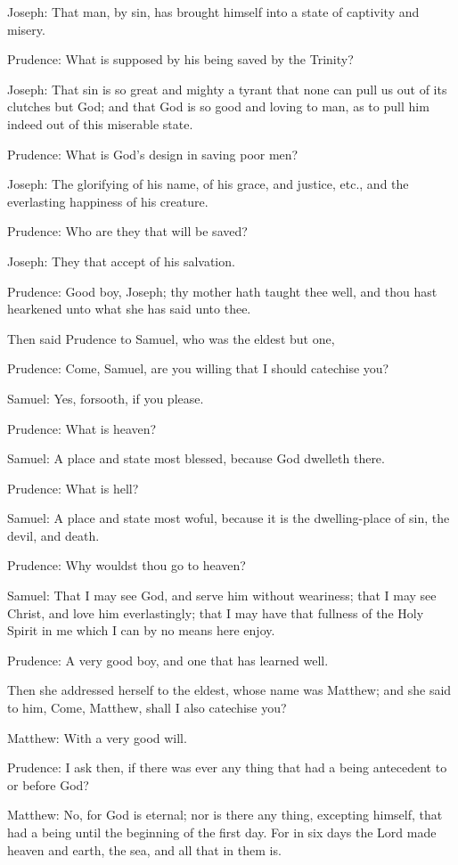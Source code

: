 Joseph: That man, by sin, has brought himself into a state of captivity and misery.

Prudence: What is supposed by his being saved by the Trinity?

Joseph: That sin is so great and mighty a tyrant that none can pull us out of its clutches but God; and that God is so good and loving to man, as to pull him indeed out of this miserable state.

Prudence: What is God's design in saving poor men?

Joseph: The glorifying of his name, of his grace, and justice, etc., and the everlasting happiness of his creature.

Prudence: Who are they that will be saved?

Joseph: They that accept of his salvation.

Prudence: Good boy, Joseph; thy mother hath taught thee well, and thou hast hearkened unto what she has said unto thee.

Then said Prudence to Samuel, who was the eldest but one,

Prudence: Come, Samuel, are you willing that I should catechise you?

Samuel: Yes, forsooth, if you please.

Prudence: What is heaven?

Samuel: A place and state most blessed, because God dwelleth there.

Prudence: What is hell?

Samuel: A place and state most woful, because it is the dwelling-place of sin, the devil, and death.

Prudence: Why wouldst thou go to heaven?

Samuel: That I may see God, and serve him without weariness; that I may see Christ, and love him everlastingly; that I may have that fullness of the Holy Spirit in me which I can by no means here enjoy.

Prudence: A very good boy, and one that has learned well.

Then she addressed herself to the eldest, whose name was Matthew; and she said to him, Come, Matthew, shall I also catechise you?

Matthew: With a very good will.

Prudence: I ask then, if there was ever any thing that had a being antecedent to or before God?

Matthew: No, for God is eternal; nor is there any thing, excepting himself, that had a being until the beginning of the first day. For in six days the Lord made heaven and earth, the sea, and all that in them is.

